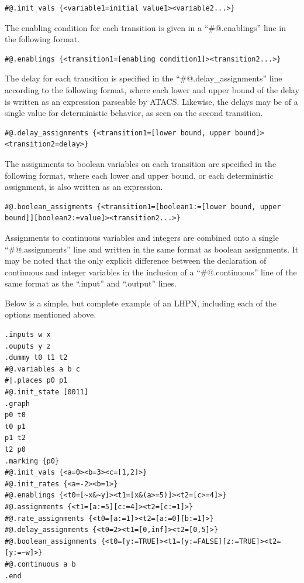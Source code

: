 \documentclass[titlepage,11pt]{article}
\begin{document}
\begin{verbatim}
#@.init_vals {<variable1=initial value1><variable2...>}
\end{verbatim}

The enabling condition for each transition is given in a ``\#@.enablings'' line
in the following format.

\begin{verbatim}
#@.enablings {<transition1=[enabling condition1]><transition2...>}
\end{verbatim}

The delay for each transition is specified in the ``\#@.delay\_assignments'' 
line according to the following format, where each lower and upper bound of the
delay is written as an expression parseable by ATACS.  Likewise, the delays may
be of a single value for deterministic behavior, as seen on the second 
transition.

\begin{verbatim}
#@.delay_assignments {<transition1=[lower bound, upper bound]><transition2=delay>}
\end{verbatim}

The assignments to boolean variables on each transition are specified in the
following format, where each lower and upper bound, or each deterministic
assignment, is also written as an expression.

\begin{verbatim}
#@.boolean_assigments {<transition1=[boolean1:=[lower bound, upper bound]][boolean2:=value]><transition2...>}
\end{verbatim}

Assignments to continuous variables and integers are combined onto a single
``\#@.assignments'' line and written  in the same format as boolean assignments.
It may be noted that the only explicit difference between the declaration of
continuous and integer variables in the inclusion of a ``\#@.continuous'' line
of the same format as the ``.input'' and ``.output'' lines.

\noindent
Below is a simple, but complete example of an LHPN, including each of the 
options mentioned above.

\begin{verbatim}
.inputs w x
.ouputs y z
.dummy t0 t1 t2
#@.variables a b c
#|.places p0 p1
#@.init_state [0011]
.graph
p0 t0
t0 p1
p1 t2
t2 p0
.marking {p0}
#@.init_vals {<a=0><b=3><c=[1,2]>}
#@.init_rates {<a=-2><b=1>}
#@.enablings {<t0=[~x&~y]><t1=[x&(a>=5)]><t2=[c>=4]>}
#@.assignments {<t1=[a:=5][c:=4]><t2=[c:=1]>}
#@.rate_assignments {<t0=[a:=1]><t2=[a:=0][b:=1]>}
#@.delay_assignments {<t0=2><t1=[0,inf]><t2=[0,5]>}
#@.boolean_assignments {<t0=[y:=TRUE]><t1=[y:=FALSE][z:=TRUE]><t2=[y:=~w]>}
#@.continuous a b
.end
\end{verbatim}
\end{document}
